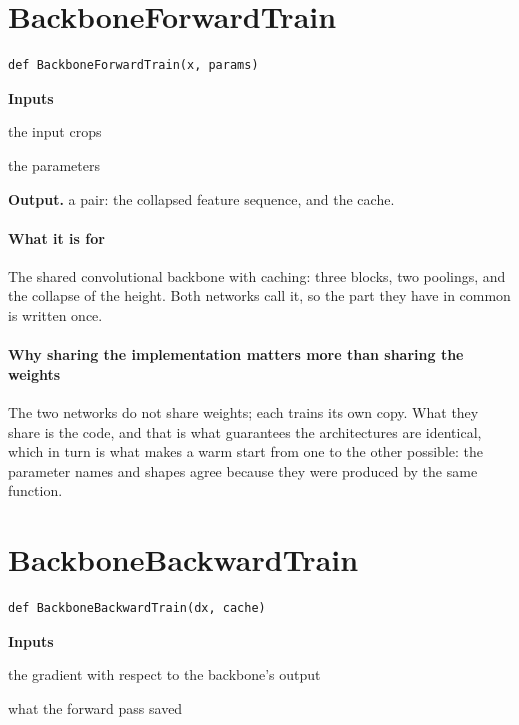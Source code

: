 \section{BackboneForwardTrain}
\begin{lstlisting}[style=sig]
def BackboneForwardTrain(x, params)
\end{lstlisting}

\noindent\textbf{Inputs}
\begin{description}[leftmargin=2.2em,style=nextline,font=\normalfont\ttfamily]\setlength\itemsep{1pt}
  \item[{x}] \normalfont the input crops
  \item[{params}] \normalfont the parameters
\end{description}

\noindent\textbf{Output.} a pair: the collapsed feature sequence, and the cache.


\paragraph{What it is for}
The shared convolutional backbone with caching: three blocks, two poolings, and the collapse of the height. Both networks call it, so the part they have in common is written once.


\paragraph{Why sharing the implementation matters more than sharing the weights}
The two networks do not share weights; each trains its own copy. What they share is the code, and that is what guarantees the architectures are identical, which in turn is what makes a warm start from one to the other possible: the parameter names and shapes agree because they were produced by the same function.


\section{BackboneBackwardTrain}
\begin{lstlisting}[style=sig]
def BackboneBackwardTrain(dx, cache)
\end{lstlisting}

\noindent\textbf{Inputs}
\begin{description}[leftmargin=2.2em,style=nextline,font=\normalfont\ttfamily]\setlength\itemsep{1pt}
  \item[{dx}] \normalfont the gradient with respect to the backbone's output
  \item[{cache}] \normalfont what the forward pass saved
\end{description}

